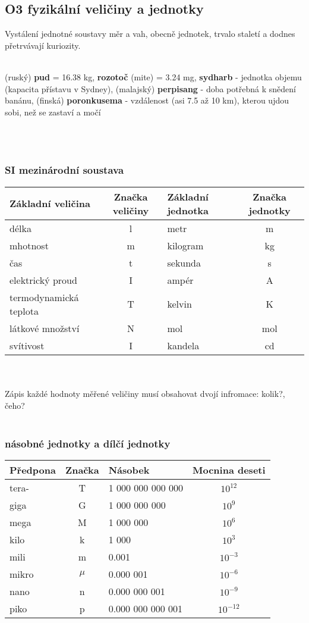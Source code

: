 \documentclass{article}
\begin{document}
\subsection*{O3 fyzikální veličiny a jednotky}
Vystálení jednotné soustavy měr a vah, obecně jednotek, trvalo staletí a dodnes přetrvávají kuriozity.\\\\
\begin{footnotesize}
(ruský) \textbf{pud} = 16.38 kg, \textbf{rozotoč} (mite) = 3.24 mg, \textbf{sydharb} - jednotka objemu (kapacita přístavu v Sydney), (malajský) \textbf{perpisang} - doba potřebná k snědení banánu, (finská) \textbf{poronkusema} - vzdálenost (asi 7.5 až 10 km), kterou ujdou sobi, než se zastaví a močí
\end{footnotesize}\\\\

\subsubsection*{SI mezinárodní soustava}
\begin{tabular}{|l|c|l|c|}
\hline
Základní veličina & Značka veličiny & Základní jednotka & Značka jednotky \\
\hline
délka & l & metr & m \\
mhotnost & m & kilogram & kg \\
čas & t & sekunda & s \\
elektrický proud & I & ampér & A \\
termodynamická teplota & T & kelvin & K \\
látkové množství & N & mol & mol \\
svítivost & I & kandela & cd \\
\hline
\end{tabular}\\\\
Zápis každé hodnoty měřené veličiny musí obsahovat dvojí infromace: kolik?, čeho? \\\\

\subsubsection*{násobné jednotky a dílčí jednotky}
\begin{tabular}{|l|c|l|c|}
\hline
Předpona & Značka & Násobek & Mocnina deseti \\
\hline
tera- & T & 1 000 000 000 000 & $10^{12}$\\
giga & G & 1 000 000 000 & $10^{9}$ \\
mega & M & 1 000 000 & $10^{6}$ \\
kilo & k & 1 000 & $10^{3}$\\
mili & m & 0.001 & $10^{-3}$ \\
mikro & $\mu$ & 0.000 001 & $10^{-6}$\\
nano & n & 0.000 000 001 & $10^{-9}$ \\
piko & p & 0.000 000 000 001 & $10^{-12}$ \\
\hline
\end{tabular}
\end{document}
